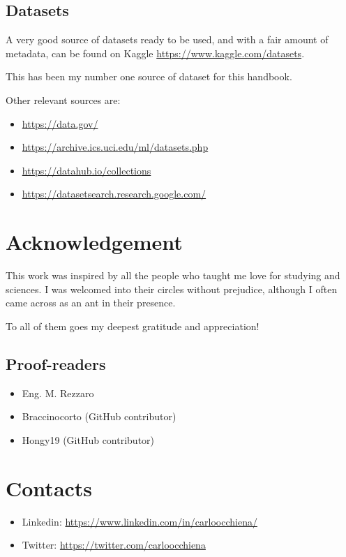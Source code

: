 \documentclass{article}
\begin{document}
\subsection{Datasets}
A very good source of datasets ready to be used, and with a fair amount of metadata, can be found on Kaggle \url{https://www.kaggle.com/datasets}. 

This has been my number one source of dataset for this handbook.

Other relevant sources are:
\begin{itemize}
    \item \url{ https://data.gov/ }
    \item \url{https://archive.ics.uci.edu/ml/datasets.php }
    \item \url{https://datahub.io/collections }
    \item \url{https://datasetsearch.research.google.com/ }
\end{itemize}

\section{Acknowledgement}
This work was inspired by all the people who taught me love for studying and sciences. I was welcomed into their circles without prejudice, although I often came across as an ant in their presence.

To all of them goes my deepest gratitude and appreciation! 

\subsection{Proof-readers}
\begin{itemize}
    \item Eng. M. Rezzaro
    \item Braccinocorto (GitHub contributor)
    \item Hongy19 (GitHub contributor)
\end{itemize}


\section{Contacts}
\begin{itemize}
    \item Linkedin: \url{https://www.linkedin.com/in/carloocchiena/} 
    \item Twitter: \url{https://twitter.com/carloocchiena} 
\end{itemize}
\end{document}
